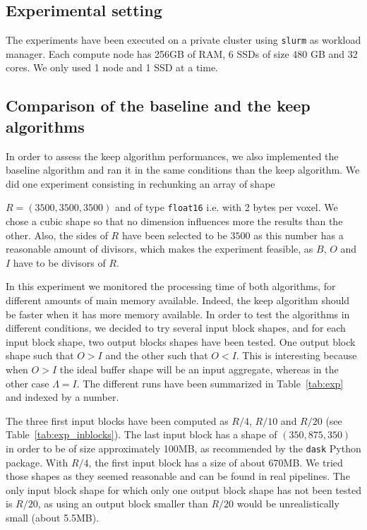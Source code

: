\documentclass[sigconf, nonacm]{acmart}
\begin{document}
{\subsection{Experimental setting}
The experiments have been executed on a private
cluster using \texttt{slurm} as workload manager. Each compute node has 256GB of
RAM, 6 SSDs of size 480 GB and 32 cores. We only used 1 node and 1 SSD at a
time.

\subsection{Comparison of the baseline and the keep algorithms}
In order to assess the keep algorithm performances, we also implemented the
baseline algorithm and ran it in the same conditions than the keep algorithm.
We did one experiment consisting in rechunking an array of shape

$R=(3500,3500,3500)$ and of type \texttt{float16} i.e. with 2 bytes per voxel.
We chose a cubic shape so that no dimension influences more the results than
the other.
Also, the sides of $R$ have been selected to be $3500$ as this number has a
reasonable amount of divisors, which makes the experiment feasible, as
$B$, $O$ and $I$ have to be divisors of $R$.

In this experiment we monitored the processing time of both algorithms, for
different amounts of main memory available.
Indeed, the keep algorithm should be faster when it has more memory available.
In order to test the algorithms in different conditions, we decided to try
several input block shapes, and for each input block shape, two output blocks
shapes have been tested. One output block shape such that $O>I$ and the other
such that $O<I$. This is interesting because when $O>I$ the ideal buffer shape
will be an input aggregate, whereas in the other case $\Lambda=I$.
The different runs have been summarized in Table~\ref{tab:exp} and indexed by
a number.

The three first input blocks have been computed as $R/4$, $R/10$ and $R/20$
(see Table~\ref{tab:exp_inblocks}).
The last input block has a shape of $(350,875,350)$ in order to be of size
approximately 100MB, as recommended by the \texttt{dask} Python package.
With $R/4$, the first input block has a size of about 670MB.
We tried those shapes as they seemed reasonable and can be found in real pipelines.
The only input block shape for which only one output block shape has not been tested
is $R/20$, as using an output block smaller than $R/20$ would be unrealistically
small (about 5.5MB).

}
\end{document}
